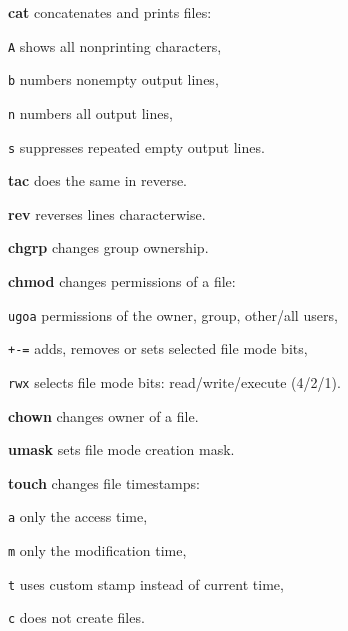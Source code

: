 \begin{enumx}
	\item [\cmdblack] \textbf{cat} concatenates and prints files:
	\item [\texttt{A}] shows all nonprinting characters,
	\item [\texttt{b}] numbers nonempty output lines,
	\item [\texttt{n}] numbers all output lines,
	\item [\texttt{s}] suppresses repeated empty output lines.
	\item [\cmdblack] \textbf{tac} does the same in reverse.
	\item [\cmd] \textbf{rev} reverses lines characterwise.
\end{enumx}

\begin{enumx}
	\item [\cmdblack] \textbf{chgrp} changes group ownership.
	
	\item [\cmdblack] \textbf{chmod} changes permissions of a file:
	\item [\texttt{ugoa}] permissions of the owner, group, other/all users,
	\item [\texttt{+-=}] adds, removes or sets selected file mode bits,
	\item [\texttt{rwx}] selects file mode bits: read/write/execute (4/2/1).
	
	\item [\cmdblack] \textbf{chown} changes owner of a file.
	
	\item [\cmd] \textbf{umask} sets file mode creation mask.

	\item [\cmdblack] \textbf{touch} changes file timestamps:
	\item [\texttt{a}] only the access time,
	\item [\texttt{m}] only the modification time,
	\item [\texttt{t}] uses custom stamp instead of current time,
	\item [\texttt{c}] does not create files.
\end{enumx}

